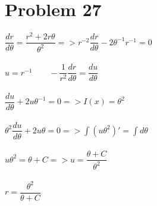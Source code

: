 \documentclass[12pt]{exam}
\begin{document}
\section*{Problem 27}
$\dfrac{dr}{d\theta}=\dfrac{r^2+2r\theta}{\theta^2}=>r^{-2}\dfrac{dr}{d\theta}-2\theta^{-1}r^{-1}=0$\\\\
$u=r^{-1}\qquad-\dfrac{1}{r^2}\dfrac{dr}{d\theta}=\dfrac{du}{d\theta}$\\\\
$\dfrac{du}{d\theta}+2u\theta^{-1}=0=>I(x)=\theta^2$\\\\
$\theta^2\dfrac{du}{d\theta}+2u\theta=0=>\int(u\theta^2)'=\int d\theta$\\\\
$u\theta^2=\theta+C=>u=\dfrac{\theta+C}{\theta^2}$\\\\
$r=\dfrac{\theta^2}{\theta+C}$
\end{document}
